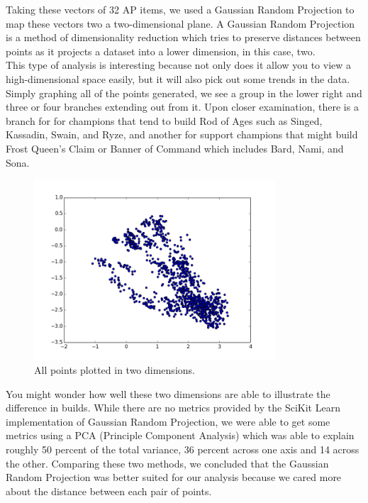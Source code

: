 \documentclass[11pt]{amsart}
\begin{document}
Taking these vectors of 32 AP items, we used a Gaussian Random Projection to map these vectors two a two-dimensional plane. A Gaussian Random Projection is a method of dimensionality reduction which tries to preserve distances between points as it projects a dataset into a lower dimension, in this case, two.\\

This type of analysis is interesting because not only does it allow you to view a high-dimensional space easily, but it will also pick out some trends in the data. Simply graphing all of the points generated, we see a group in the lower right and three or four branches extending out from it. Upon closer examination, there is a branch for for champions that tend to build Rod of Ages such as Singed, Kassadin, Swain, and Ryze, and another for support champions that might build Frost Queen's Claim or Banner of Command which includes Bard, Nami, and Sona.\\

\begin{figure}[h!]
  \caption{All points plotted in two dimensions.}
  \centering
    \includegraphics[width=0.8\textwidth]{figure_1.png}
\end{figure}

You might wonder how well these two dimensions are able to illustrate the difference in builds. While there are no metrics provided by the SciKit Learn implementation of Gaussian Random Projection, we were able to get some metrics using a PCA (Principle Component Analysis) which was able to explain roughly 50 percent of the total variance, 36 percent across one axis and 14 across the other. Comparing these two methods, we concluded that the Gaussian Random Projection was better suited for our analysis because we cared more about the distance between each pair of points.\\
\end{document}
